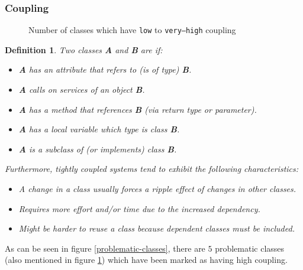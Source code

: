 \documentclass[12pt]{article}
\DeclareRobustCommand{\ul}[1]{%
	\uline{\phantom{#1}}%
	\llap{\contour{white}{#1}}%
}
\newtheorem*{definition}{Definition}
\begin{document}
\subsubsection{Coupling}

\begin{figure}[H]
    \centering
    \caption{Number of classes which have \texttt{low} to
    \texttt{very--high} coupling}
    \label{coupling-diag}
\end{figure}

\begin{definition}
    Two classes \textbf{A} and \textbf{B} are \ul{coupled} if:
    \begin{itemize}
        \item \textbf{A} has an attribute that refers to (is of type)
            \textbf{B}.
        \item \textbf{A} calls on services of an object
            \textbf{B}.
        \item \textbf{A} has a method that references \textbf{B}
            (via return type or parameter).
        \item \textbf{A} has a local variable which type is
            class \textbf{B}.
        \item \textbf{A} is a subclass of (or implements) class
            \textbf{B}.
    \end{itemize}

    Furthermore, tightly coupled systems tend to exhibit the
    following characteristics:
    \begin{itemize}
        \item A change in a class usually forces a ripple effect
            of changes in other classes.
        \item Requires more effort and/or time due to the
            increased dependency.
        \item Might be harder to reuse a class because dependent
            classes must be included.
    \end{itemize}
\end{definition}

As can be seen in figure \ref{problematic-classes}, there are
$5$ problematic classes (also mentioned in figure
\ref{coupling-diag}) which have been marked as having high
coupling.
\end{document}
